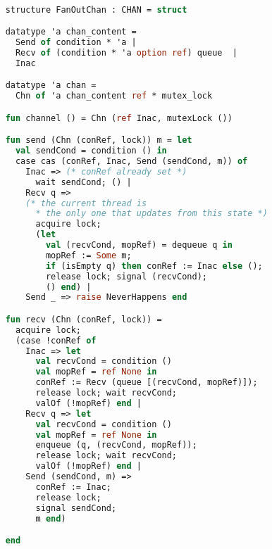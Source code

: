   \begin{lstlisting}[language=ML, style=codestyle1]

    structure FanOutChan : CHAN = struct

    datatype 'a chan_content =
      Send of condition * 'a |
      Recv of (condition * 'a option ref) queue  |
      Inac

    datatype 'a chan =
      Chn of 'a chan_content ref * mutex_lock

    fun channel () = Chn (ref Inac, mutexLock ())

    fun send (Chn (conRef, lock)) m = let
      val sendCond = condition () in
      case cas (conRef, Inac, Send (sendCond, m)) of
        Inac => (* conRef already set *)
          wait sendCond; () |
        Recv q => 
        (* the current thread is
          * the only one that updates from this state *)
          acquire lock;
          (let
            val (recvCond, mopRef) = dequeue q in
            mopRef := Some m; 
            if (isEmpty q) then conRef := Inac else (); 
            release lock; signal (recvCond);
            () end) |
        Send _ => raise NeverHappens end

    fun recv (Chn (conRef, lock)) =
      acquire lock;
      (case !conRef of
        Inac => let
          val recvCond = condition ()
          val mopRef = ref None in
          conRef := Recv (queue [(recvCond, mopRef)]);
          release lock; wait recvCond;
          valOf (!mopRef) end |
        Recv q => let
          val recvCond = condition () 
          val mopRef = ref None in
          enqueue (q, (recvCond, mopRef));
          release lock; wait recvCond;
          valOf (!mopRef) end |
        Send (sendCond, m) =>
          conRef := Inac;
          release lock;
          signal sendCond;
          m end) 

    end 
  \end{lstlisting}

